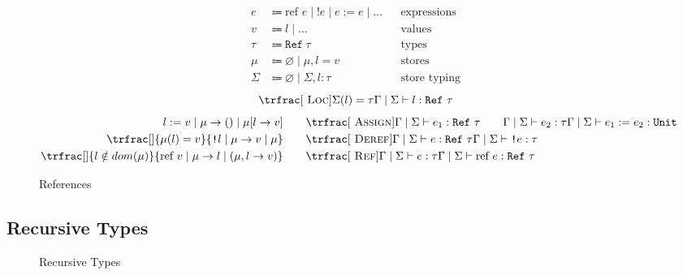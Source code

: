 \documentclass[nonacm]{acmart}
\newcommand{\unit}{\texttt{Unit}}
\newcommand{\reference}[1]{\text{ref } #1}
\begin{document}
\begin{figure}
  \begin{framed}
    \begin{align*}
      e      & \Coloneqq \reference{e} \mid \texttt{!}e \mid e := e \mid \dots &  & \text{expressions}  \\
      v      & \Coloneqq l \mid \dots                                          &  & \text{values}       \\
      \tau   & \Coloneqq \texttt{Ref}~\tau                                     &  & \text{types}        \\
      \mu    & \Coloneqq \varnothing \mid \mu, l = v                           &  & \text{stores}       \\
      \Sigma & \Coloneqq \varnothing \mid \Sigma, l : \tau                     &  & \text{store typing}
    \end{align*}
    \[
      \trfrac[~\textsc{Loc}]{\Sigma(l) = \tau}{\Gamma \mid \Sigma \vdash l : \texttt{Ref}~\tau}
    \]
    \begin{align*}
      l := v \mid \mu \rightarrow () \mid \mu[l \rightarrow v]
      \qquad &
      \trfrac[~\textsc{Assign}]{\Gamma \mid \Sigma \vdash e_1 :
        \texttt{Ref}~\tau \qquad \Gamma \mid \Sigma \vdash e_2 : \tau}{
      \Gamma \mid \Sigma \vdash e_1 := e_2 : \unit}                                                                           \\
      \trfrac[]{\mu (l) = v}{\texttt{!} l \mid \mu \rightarrow v \mid \mu}
      \qquad &
      \trfrac[~\textsc{Deref}]{\Gamma \mid \Sigma \vdash e : \texttt{Ref}~\tau}{\Gamma \mid \Sigma \vdash \texttt{!}e : \tau} \\
      \trfrac[]{l \notin dom(\mu)}{\reference{v} \mid \mu \rightarrow l \mid (\mu, l \rightarrow v)}
      \qquad &
      \trfrac[~\textsc{Ref}]{\Gamma \mid \Sigma \vdash e : \tau}{\Gamma \mid \Sigma \vdash \reference{e} : \texttt{Ref}~\tau}
    \end{align*}
  \end{framed}
  \caption{References}\label{fig:references}
\end{figure}

\subsection{Recursive Types}

\begin{figure}
  \begin{framed}
  \end{framed}
  \caption{Recursive Types}\label{fig:recursive-types}
\end{figure}
\end{document}
